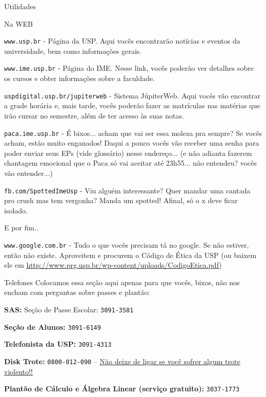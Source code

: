 \begin{secao}{Utilidades}

\begin{subsecao}{Na WEB}

{\tt www.usp.br} - Página da USP. Aqui vocês encontrarão notícias e eventos da
universidade, bem como informações gerais.

{\tt www.ime.usp.br} - Página do IME.
Nesse link, vocês poderão ver detalhes sobre os cursos e obter informações sobre
a faculdade.

{\tt uspdigital.usp.br/jupiterweb} - Sistema JúpiterWeb. Aqui vocês vão
encontrar a grade horária e, mais tarde, vocês poderão fazer as matrículas nas
matérias que irão cursar no semestre, além de ter acesso às suas notas.

{\tt paca.ime.usp.br} - É bixos... acham que vai ser essa moleza pra sempre? Se
vocês acham, estão muito enganados! Daqui a pouco vocês vão receber uma senha para
poder enviar seus EPs (vide glossário) nesse endereço... (e não adianta fazerem
chantagem emocional que o Paca só vai aceitar até 23h55... não entendeu? vocês
vão entender...)

{\tt fb.com/SpottedImeUsp} - Viu alguém interessante? Quer mandar uma cantada 
pro crush mas tem vergonha? Manda um spotted! Afinal, só o x deve ficar isolado.


E por fim..

{\tt www.google.com.br} - Tudo o que vocês precisam tá no google. Se não estiver,
então não existe. Aproveitem e procurem o Código de Ética da USP (ou baixem ele em
\url{http://www.prg.usp.br/wp-content/uploads/CodigoEtica.pdf})

\end{subsecao}

\begin{subsecao}{Telefones}
Colocamos essa seção aqui apenas para que vocês, bixos, não nos encham com perguntas
sobre passes e plantão:

{\bf SAS:} Seção de Passe Escolar: {\tt 3091-3581}

{\bf Seção de Alunos:} {\tt 3091-6149}

{\bf Telefonista da USP:} {\tt 3091-4313}

{\bf Disk Trote:} {\tt 0800-012-090} -- \underline{Não deixe de ligar se você sofrer algum trote violento!!}

{\bf Plantão de Cálculo e Álgebra Linear (serviço gratuito):} {\tt 3037-1773}

\end{subsecao}
\end{secao}
